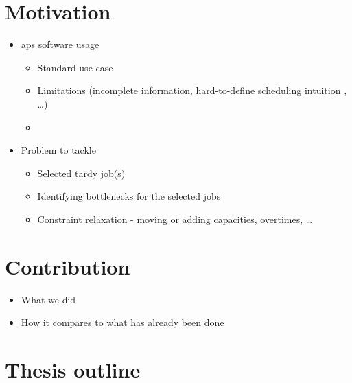 

\section*{Motivation}

\begin{itemize}
    \item \ac{aps} software usage
    \begin{itemize}
        \item Standard use case
        \item Limitations (incomplete information, hard-to-define scheduling intuition , \dots)
        \item {}
    \end{itemize}

    \item Problem to tackle
    \begin{itemize}
        \item Selected tardy job(s)
        \item Identifying bottlenecks for the selected jobs
        \item Constraint relaxation - moving or adding capacities, overtimes, \dots
    \end{itemize}
\end{itemize}

\section*{Contribution}

\begin{itemize}
    \item What we did
    \item How it compares to what has already been done
\end{itemize}

\section*{Thesis outline}

